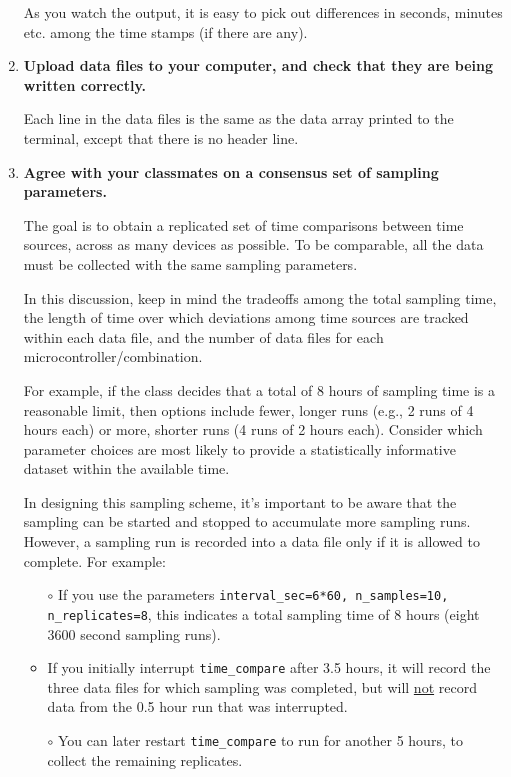 \begin{enumerate}
	As you watch the output, it is easy to pick out differences in seconds, minutes etc. among the time stamps (if there are any).
	
	\item \textbf{Upload data files to your computer, and check that they are being written correctly.}
	
	Each line in the data files is the same as the data array printed to the terminal, except that there is no header line.
	
	\item \textbf{Agree with your classmates on a consensus set of sampling parameters.}
	
	The goal is to obtain a replicated set of time comparisons between time sources, across as many devices as possible. 
	To be comparable, all the data must be collected with the same sampling parameters.
	
	\smallskip
	In this discussion, keep in mind the tradeoffs among the total sampling time, the length of time over which deviations among time sources are tracked within each data file, and the number of data files for each microcontroller/\rtc combination. 
	
	\smallskip
	For example, if the class decides that a total of 8 hours of sampling time is a reasonable limit, then options include fewer, longer runs (e.g., 2 runs of 4 hours each) or more, shorter runs (4 runs of 2 hours each).
	Consider which parameter choices are most likely to provide a statistically informative dataset within the available time.
	
	\smallskip
	In designing this sampling scheme, it's important to be aware that the sampling can be started and stopped to accumulate more sampling runs.
	However, a sampling run is recorded into a data file only if it is allowed to complete.	For example:
\begin{itemize}
	\item[$\circ$] If you use the parameters \lstinline{interval_sec=6*60, n_samples=10, n_replicates=8}, this indicates a total sampling time of 8 hours (eight 3600 second sampling runs).
	
	\item[$\circ$] If you initially interrupt \lstinline{time_compare} after 3.5 hours, it will record the three data files for which sampling was completed, but will \underline{not} record data from the 0.5 hour run that was interrupted.
	
	\item[$\circ$] You can later restart \lstinline{time_compare} to run for another 5 hours, to collect the remaining replicates.
\end{itemize}	
	 

\end{enumerate}
